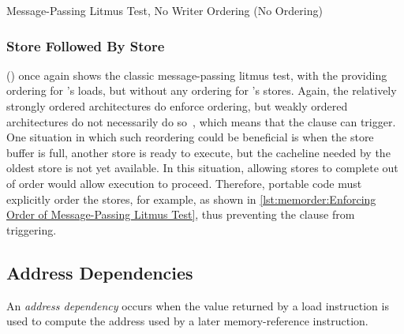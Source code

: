 \begin{listing}

\caption{Message-Passing Litmus Test, No Writer Ordering (No Ordering)}
\label{lst:memorder:Message-Passing Litmus Test; No Writer Ordering (No Ordering)}
\end{listing}

\subsubsection{Store Followed By Store}
\label{sec:memorder:Store Followed By Store}

()
once again shows the classic message-passing litmus test, with the
 providing ordering for 's loads, but without
any ordering for 's stores.
Again, the relatively strongly ordered architectures do enforce ordering,
but weakly ordered architectures do not necessarily do
so~\cite{JadeAlglave2011ppcmem}, which means that the
 clause can trigger.
One situation in which such reordering could be beneficial is when
the store buffer is full, another store is ready to execute, but the
cacheline needed by the oldest store is not yet available.
In this situation, allowing stores to complete out of order would
allow execution to proceed.
Therefore, portable code must explicitly order the stores, for
example, as shown in
\cref{lst:memorder:Enforcing Order of Message-Passing Litmus Test},
thus preventing the  clause from triggering.

\QuickQuizEnd

\subsection{Address Dependencies}
\label{sec:memorder:Address Dependencies}

An \emph{address dependency} occurs when the value returned by a load
instruction is used to compute the address used by a later memory-reference
instruction.

